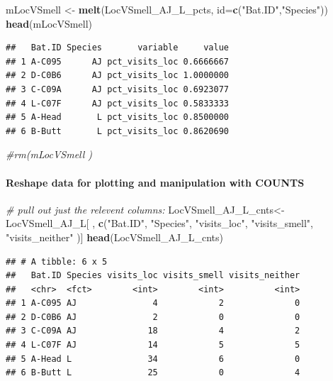 \documentclass[]{article}
\newenvironment{Shaded}{\begin{snugshade}}{\end{snugshade}}
\newcommand{\KeywordTok}[1]{\textcolor[rgb]{0.13,0.29,0.53}{\textbf{{#1}}}}
\newcommand{\DataTypeTok}[1]{\textcolor[rgb]{0.13,0.29,0.53}{{#1}}}
\newcommand{\StringTok}[1]{\textcolor[rgb]{0.31,0.60,0.02}{{#1}}}
\newcommand{\CommentTok}[1]{\textcolor[rgb]{0.56,0.35,0.01}{\textit{{#1}}}}
\newcommand{\NormalTok}[1]{{#1}}
\let\oldparagraph\paragraph
\renewcommand{\paragraph}[1]{\oldparagraph{#1}\mbox{}}
\begin{document}
\begin{Shaded}
\begin{Highlighting}[]
\NormalTok{mLocVSmell <-}\StringTok{ }\KeywordTok{melt}\NormalTok{(LocVSmell_AJ_L_pcts, }\DataTypeTok{id=}\KeywordTok{c}\NormalTok{(}\StringTok{"Bat.ID"}\NormalTok{,}\StringTok{"Species"}\NormalTok{))}
\KeywordTok{head}\NormalTok{(mLocVSmell)}
\end{Highlighting}
\end{Shaded}

\begin{verbatim}
##   Bat.ID Species       variable     value
## 1 A-C095      AJ pct_visits_loc 0.6666667
## 2 D-C0B6      AJ pct_visits_loc 1.0000000
## 3 C-C09A      AJ pct_visits_loc 0.6923077
## 4 L-C07F      AJ pct_visits_loc 0.5833333
## 5 A-Head       L pct_visits_loc 0.8500000
## 6 B-Butt       L pct_visits_loc 0.8620690
\end{verbatim}

\begin{Shaded}
\begin{Highlighting}[]
\CommentTok{#rm(mLocVSmell )}
\end{Highlighting}
\end{Shaded}

\paragraph{Reshape data for plotting and manipulation with
COUNTS}\label{reshape-data-for-plotting-and-manipulation-with-counts-1}

\begin{Shaded}
\begin{Highlighting}[]
\CommentTok{# pull out just the relevent columns: }
\NormalTok{LocVSmell_AJ_L_cnts<-}\StringTok{ }\NormalTok{LocVSmell_AJ_L[ , }\KeywordTok{c}\NormalTok{(}\StringTok{"Bat.ID"}\NormalTok{, }\StringTok{"Species"}\NormalTok{, }\StringTok{"visits_loc"}\NormalTok{, }\StringTok{"visits_smell"}\NormalTok{, }\StringTok{"visits_neither"} \NormalTok{)]}
\KeywordTok{head}\NormalTok{(LocVSmell_AJ_L_cnts)}
\end{Highlighting}
\end{Shaded}

\begin{verbatim}
## # A tibble: 6 x 5
##   Bat.ID Species visits_loc visits_smell visits_neither
##   <chr>  <fct>        <int>        <int>          <int>
## 1 A-C095 AJ               4            2              0
## 2 D-C0B6 AJ               2            0              0
## 3 C-C09A AJ              18            4              2
## 4 L-C07F AJ              14            5              5
## 5 A-Head L               34            6              0
## 6 B-Butt L               25            0              4
\end{verbatim}
\end{document}
